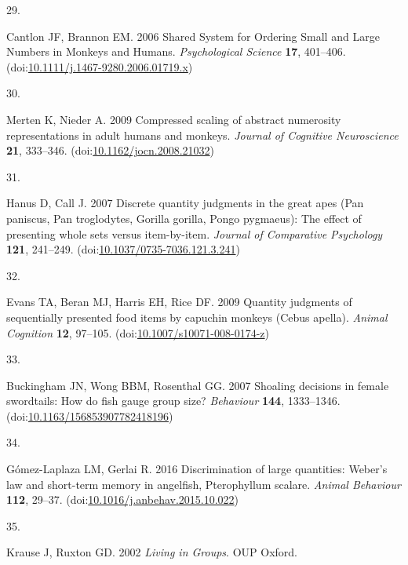 \documentclass[
  ,doc,floatsintext]{apa6}
\newlength{\cslhangindent}
\newlength{\csllabelwidth}
\newlength{\cslentryspacingunit} %
\newenvironment{CSLReferences}[2] %
 {%
  \setlength{\parindent}{0pt}
  \ifodd #1
  \let\oldpar\par
  \def\par{\hangindent=\cslhangindent\oldpar}
  \fi
  \setlength{\parskip}{#2\cslentryspacingunit}
 }%
 {}
\newcommand{\CSLLeftMargin}[1]{\parbox[t]{\csllabelwidth}{#1}}
\newcommand{\CSLRightInline}[1]{\parbox[t]{\linewidth - \csllabelwidth}{#1}\break}
\begin{document}
\begin{CSLReferences}{0}{0}
\leavevmode{}%
\CSLLeftMargin{29. }%
\CSLRightInline{Cantlon JF, Brannon EM. 2006 Shared {System} for {Ordering} {Small} and {Large} {Numbers} in {Monkeys} and {Humans}. \emph{Psychological Science} \textbf{17}, 401--406. (doi:\href{https://doi.org/10.1111/j.1467-9280.2006.01719.x}{10.1111/j.1467-9280.2006.01719.x})}

\leavevmode{}%
\CSLLeftMargin{30. }%
\CSLRightInline{Merten K, Nieder A. 2009 Compressed scaling of abstract numerosity representations in adult humans and monkeys. \emph{Journal of Cognitive Neuroscience} \textbf{21}, 333--346. (doi:\href{https://doi.org/10.1162/jocn.2008.21032}{10.1162/jocn.2008.21032})}

\leavevmode{}%
\CSLLeftMargin{31. }%
\CSLRightInline{Hanus D, Call J. 2007 Discrete quantity judgments in the great apes ({Pan} paniscus, {Pan} troglodytes, {Gorilla} gorilla, {Pongo} pygmaeus): {The} effect of presenting whole sets versus item-by-item. \emph{Journal of Comparative Psychology} \textbf{121}, 241--249. (doi:\href{https://doi.org/10.1037/0735-7036.121.3.241}{10.1037/0735-7036.121.3.241})}

\leavevmode{}%
\CSLLeftMargin{32. }%
\CSLRightInline{Evans TA, Beran MJ, Harris EH, Rice DF. 2009 Quantity judgments of sequentially presented food items by capuchin monkeys ({Cebus} apella). \emph{Animal Cognition} \textbf{12}, 97--105. (doi:\href{https://doi.org/10.1007/s10071-008-0174-z}{10.1007/s10071-008-0174-z})}

\leavevmode{}%
\CSLLeftMargin{33. }%
\CSLRightInline{Buckingham JN, Wong BBM, Rosenthal GG. 2007 Shoaling decisions in female swordtails: {How} do fish gauge group size? \emph{Behaviour} \textbf{144}, 1333--1346. (doi:\href{https://doi.org/10.1163/156853907782418196}{10.1163/156853907782418196})}

\leavevmode{}%
\CSLLeftMargin{34. }%
\CSLRightInline{Gómez-Laplaza LM, Gerlai R. 2016 Discrimination of large quantities: {Weber}'s law and short-term memory in angelfish, {Pterophyllum} scalare. \emph{Animal Behaviour} \textbf{112}, 29--37. (doi:\href{https://doi.org/10.1016/j.anbehav.2015.10.022}{10.1016/j.anbehav.2015.10.022})}

\leavevmode{}%
\CSLLeftMargin{35. }%
\CSLRightInline{Krause J, Ruxton GD. 2002 \emph{Living in {Groups}}. OUP Oxford. }


\end{CSLReferences}
\end{document}
